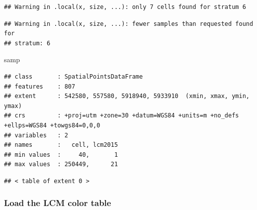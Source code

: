 \documentclass[]{article}
\newenvironment{Shaded}{\begin{snugshade}}{\end{snugshade}}
\newcommand{\KeywordTok}[1]{\textcolor[rgb]{0.13,0.29,0.53}{\textbf{#1}}}
\newcommand{\NormalTok}[1]{#1}
\newcommand{\OperatorTok}[1]{\textcolor[rgb]{0.81,0.36,0.00}{\textbf{#1}}}
\begin{document}
\begin{verbatim}
## Warning in .local(x, size, ...): only 7 cells found for stratum 6
\end{verbatim}

\begin{verbatim}
## Warning in .local(x, size, ...): fewer samples than requested found for
## stratum: 6
\end{verbatim}

\begin{Shaded}
\begin{Highlighting}[]
\NormalTok{samp}
\end{Highlighting}
\end{Shaded}

\begin{verbatim}
## class       : SpatialPointsDataFrame 
## features    : 807 
## extent      : 542580, 557580, 5918940, 5933910  (xmin, xmax, ymin, ymax)
## crs         : +proj=utm +zone=30 +datum=WGS84 +units=m +no_defs +ellps=WGS84 +towgs84=0,0,0 
## variables   : 2
## names       :   cell, lcm2015 
## min values  :     40,       1 
## max values  : 250449,      21
\end{verbatim}

\begin{Shaded}
\end{Shaded}

\begin{verbatim}
## < table of extent 0 >
\end{verbatim}

\hypertarget{load-the-lcm-color-table}{%
\subsubsection{Load the LCM color
table}\label{load-the-lcm-color-table}}
\end{document}
